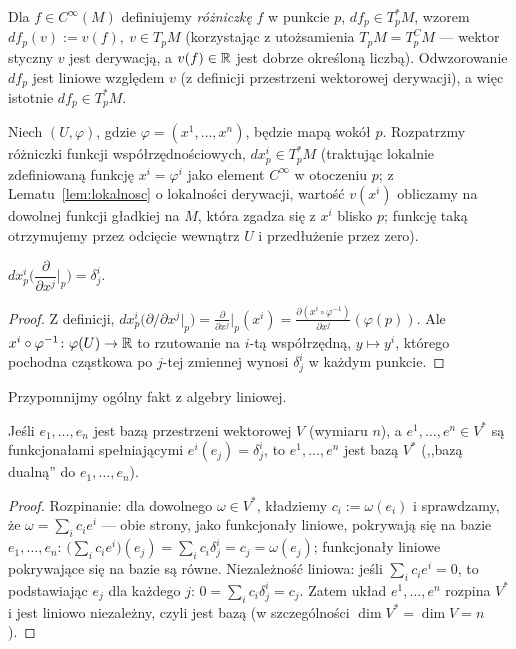 Dla $f\in C^\infty(M)$ definiujemy \emph{różniczkę} $f$ w punkcie $p$, $df_p\in T_p^*M$,
wzorem $df_p(v):=v(f), \ v\in T_pM$
(korzystając z utożsamienia $T_pM=T_p^CM$ — wektor styczny $v$ jest derywacją, a $v(f)\in
\mathbb{R}$ jest dobrze określoną liczbą). Odwzorowanie $df_p$ jest liniowe względem $v$ (z
definicji przestrzeni wektorowej derywacji), a więc istotnie $df_p\in T_p^*M$.

Niech $(U,\varphi)$, gdzie $\varphi=(x^1,\dots,x^n)$, będzie mapą wokół $p$. Rozpatrzmy różniczki funkcji
współrzędnościowych, $dx^i_p\in T_p^*M$ (traktując lokalnie zdefiniowaną funkcję
$x^i=\varphi^i$ jako element $C^\infty$ w otoczeniu $p$; z Lematu~\ref{lem:lokalnosc} o
lokalności derywacji, wartość $v(x^i)$ obliczamy na dowolnej funkcji
gładkiej na $M$, która zgadza się z $x^i$ blisko $p$; funkcję taką
otrzymujemy przez odcięcie wewnątrz $U$ i przedłużenie przez zero).

\begin{fakt}\label{fakt:dual-baza}
$dx^i_p\Big(\dfrac{\partial}{\partial x^j}\Big|_p\Big)=\delta^i_j$.
\end{fakt}
\begin{proof}
Z definicji, $dx^i_p\big(\partial/\partial x^j|_p\big)=\frac{\partial}{\partial x^j}
\Big|_p(x^i)=\frac{\partial(x^i\circ\varphi^{-1})}{\partial x^j}(\varphi(p))$. Ale
$x^i\circ\varphi^{-1}\colon\varphi(U)\to\mathbb{R}$ to rzutowanie na $i$-tą współrzędną,
$y\mapsto y^i$, którego pochodna cząstkowa po $j$-tej zmiennej wynosi $\delta^i_j$ w
każdym punkcie.
\end{proof}

Przypomnijmy ogólny fakt z algebry liniowej.

\begin{fakt}\label{fakt:baza-dualna}
Jeśli $e_1,\dots,e_n$ jest bazą przestrzeni wektorowej $V$ (wymiaru $n$), a $e^1,\dots,
e^n\in V^*$ są funkcjonałami spełniającymi $e^i(e_j)=\delta^i_j$, to $e^1,\dots,e^n$ jest
bazą $V^*$ (,,bazą dualną'' do $e_1,\dots,e_n$).
\end{fakt}
\begin{proof}
Rozpinanie: dla dowolnego $\omega\in V^*$, kładziemy $c_i:=\omega(e_i)$ i sprawdzamy, że
$\omega=\sum_ic_ie^i$ — obie strony, jako funkcjonały liniowe, pokrywają się na bazie
$e_1,\dots,e_n$: $\big(\sum_ic_ie^i\big)(e_j)=\sum_ic_i\delta^i_j=c_j=\omega(e_j)$;
funkcjonały liniowe pokrywające się na bazie są równe. Niezależność liniowa: jeśli
$\sum_ic_ie^i=0$, to podstawiając $e_j$ dla każdego $j$: $0=\sum_ic_i\delta^i_j=c_j$.
Zatem układ $e^1,\dots,e^n$ rozpina $V^*$ i jest liniowo niezależny, czyli jest bazą (w
szczególności $\dim V^*=\dim V=n$).
\end{proof}

